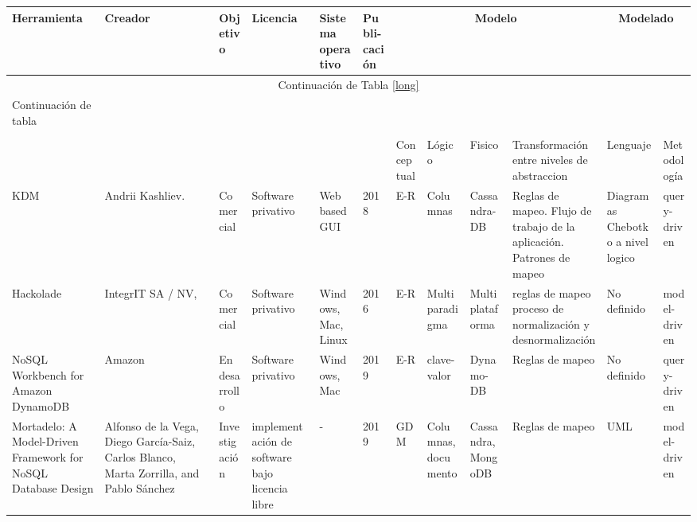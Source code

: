 
\begin{landscape}
	
	\begin{longtable}{  p{2.6cm}| p{1.7cm}| l| p{1.8cm}| p{1.7cm}|  p{1.1cm}| p{1.2cm}| p{1.7cm}| p{1.9cm}| p{1.6cm}| p{1.5cm}| p{1.5cm}  }
		
		
		\hline
		
		\textbf{Herramienta} & \textbf{Creador} & \textbf{Objetivo} & \textbf{Licencia}& \textbf{Sistema operativo} & \textbf{Publi-cación } & \multicolumn{4}{|c|}{\textbf{Modelo}}  & \multicolumn{2}{|c}{\textbf{Modelado}}\\
		
		\endfirsthead
		
		\multicolumn{12}{c}{Continuación de Tabla \ref{long}}\\
		\hline
		Continuación de tabla\\
		\hline
		\endhead
		
		\hline
		\endfoot
		
		\hline
		\multicolumn{12}{ c }{Fin de Tabla}\\
		\hline%
		\endlastfoot
		
		
		&  &  &  &  &  & Conceptual & Lógico & Fisico &  
		Transformación entre niveles de abstraccion
		& Lenguaje & Metodología\\
		\hline
		
		KDM & Andrii Kashliev. & Comercial & Software privativo & Web based GUI & 2018 & E-R & Columnas & Cassandra-DB& Reglas de mapeo. Flujo de trabajo de la aplicación. Patrones de mapeo & Diagramas Chebotko a nivel logico & query-driven\\
		
		
		
		Hackolade & IntegrIT SA / NV, & Comercial & Software privativo & Windows, Mac, Linux & 2016 & E-R & Multiparadigma & Multiplataforma & reglas de mapeo proceso de  normalización y desnormalización& No definido & model-driven \\
		
		NoSQL Workbench for Amazon DynamoDB & Amazon & En desarrollo & Software privativo & Windows, Mac & 2019 & E-R & clave-valor & Dynamo-DB & Reglas de mapeo & No definido &  query-driven \\
		
		
		Mortadelo: A Model-Driven Framework for NoSQL Database Design &  
		Alfonso de la Vega, Diego García-Saiz, Carlos Blanco, Marta Zorrilla, and Pablo Sánchez & Investigación &  
		implementación de software bajo licencia libre & - & 2019 & GDM &  Columnas, documento &  
		Cassandra, MongoDB &  Reglas de mapeo & UML & model-driven  \\
		

\end{longtable}
\end{landscape}
